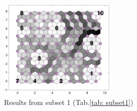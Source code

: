 \begin{figure}
        \centering
        \includegraphics[width=0.5\textwidth]{../../images0.01/M31/2D/image_subsets/subset1_dist_with_hits_t.png}
    \caption{Results from subset 1 (Tab.\ref{tab: subset1})}
    \label{fig: subset1}
\end{figure}
